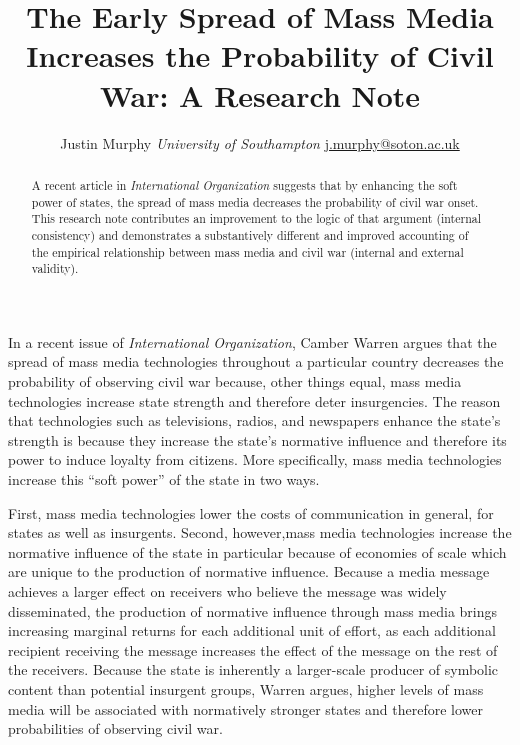 \documentclass[11pt,article,oneside]{memoir}
\title{The Early Spread of Mass Media Increases the Probability of Civil War: A
Research Note}
\author{\Large Justin Murphy\vspace{0.05in} \newline\normalsize\emph{University of Southampton} \newline\footnotesize \url{j.murphy@soton.ac.uk}\vspace*{0.2in}\newline }
\date{}
\begin{document}
  
\setsansfont[Mapping=tex-text]{Gill Sans} 
\setmonofont[Mapping=tex-text,Scale=0.8]{Consolas}
\pagestyle{kjh}

\singlespacing


\maketitle



\vspace{-4ex}
\begin{abstract}

\noindent A recent article in \emph{International Organization} suggests that by
enhancing the soft power of states, the spread of mass media decreases
the probability of civil war onset. This research note contributes an
improvement to the logic of that argument (internal consistency) and
demonstrates a substantively different and improved accounting of the
empirical relationship between mass media and civil war (internal and
external validity).

\end{abstract}

\newpage


\onehalfspacing

In a recent issue of \emph{International Organization}, Camber Warren
argues that the spread of mass media technologies throughout a
particular country decreases the probability of observing civil war
because, other things equal, mass media technologies increase state
strength and therefore deter insurgencies. The reason that technologies
such as televisions, radios, and newspapers enhance the state's strength
is because they increase the state's normative influence and therefore
its power to induce loyalty from citizens. More specifically, mass media
technologies increase this ``soft power'' of the state in two ways.

First, mass media technologies lower the costs of communication in
general, for states as well as insurgents. Second, however,mass media
technologies increase the normative influence of the state in particular
because of economies of scale which are unique to the production of
normative influence. Because a media message achieves a larger effect on
receivers who believe the message was widely disseminated, the
production of normative influence through mass media brings increasing
marginal returns for each additional unit of effort, as each additional
recipient receiving the message increases the effect of the message on
the rest of the receivers. Because the state is inherently a
larger-scale producer of symbolic content than potential insurgent
groups, Warren argues, higher levels of mass media will be associated
with normatively stronger states and therefore lower probabilities of
observing civil war.
\end{document}

